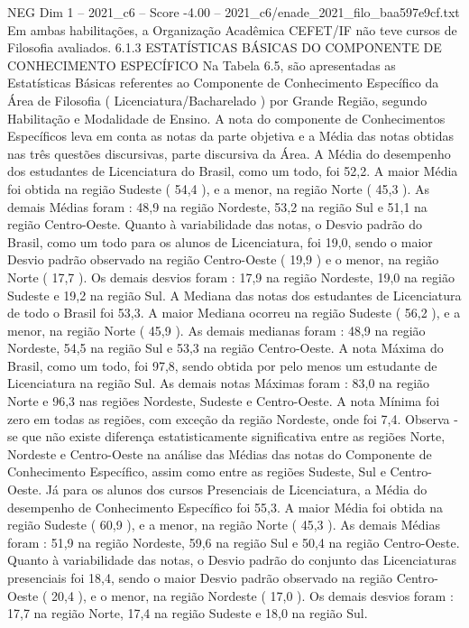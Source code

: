 \begin{textsample}{NEG Dim 1 – 2021\_c6 – Score -4.00 – 2021\_c6/enade\_2021\_filo\_baa597e9cf.txt}
Em ambas habilitações, a Organização Acadêmica CEFET/IF não teve cursos de Filosofia avaliados. 6.1.3 ESTATÍSTICAS BÁSICAS DO COMPONENTE DE CONHECIMENTO ESPECÍFICO Na Tabela 6.5, são apresentadas as Estatísticas Básicas referentes ao Componente de Conhecimento Específico da Área de Filosofia ( Licenciatura/Bacharelado ) por Grande Região, segundo Habilitação e Modalidade de Ensino.
A nota do componente de Conhecimentos Específicos leva em conta as notas da parte objetiva e a Média das notas obtidas nas três questões discursivas, parte discursiva da Área.
A Média do desempenho dos estudantes de Licenciatura do Brasil, como um todo, foi 52,2.
A maior Média foi obtida na região Sudeste ( 54,4 ), e a menor, na região Norte ( 45,3 ).
As demais Médias foram : 48,9 na região Nordeste, 53,2 na região Sul e 51,1 na região Centro-Oeste.
Quanto à variabilidade das notas, o Desvio padrão do Brasil, como um todo para os alunos de Licenciatura, foi 19,0, sendo o maior Desvio padrão observado na região Centro-Oeste ( 19,9 ) e o menor, na região Norte ( 17,7 ).
Os demais desvios foram : 17,9 na região Nordeste, 19,0 na região Sudeste e 19,2 na região Sul.
A Mediana das notas dos estudantes de Licenciatura de todo o Brasil foi 53,3.
A maior Mediana ocorreu na região Sudeste ( 56,2 ), e a menor, na região Norte ( 45,9 ).
As demais medianas foram : 48,9 na região Nordeste, 54,5 na região Sul e 53,3 na região Centro-Oeste.
A nota Máxima do Brasil, como um todo, foi 97,8, sendo obtida por pelo menos um estudante de Licenciatura na região Sul.
As demais notas Máximas foram : 83,0 na região Norte e 96,3 nas regiões Nordeste, Sudeste e Centro-Oeste.
A nota Mínima foi zero em todas as regiões, com exceção da região Nordeste, onde foi 7,4.
Observa -se que não existe diferença estatisticamente significativa entre as regiões Norte, Nordeste e Centro-Oeste na análise das Médias das notas do Componente de Conhecimento Específico, assim como entre as regiões Sudeste, Sul e Centro-Oeste.
Já para os alunos dos cursos Presenciais de Licenciatura, a Média do desempenho de Conhecimento Específico foi 55,3.
A maior Média foi obtida na região Sudeste ( 60,9 ), e a menor, na região Norte ( 45,3 ).
As demais Médias foram : 51,9 na região Nordeste, 59,6 na região Sul e 50,4 na região Centro-Oeste.
Quanto à variabilidade das notas, o Desvio padrão do conjunto das Licenciaturas presenciais foi 18,4, sendo o maior Desvio padrão observado na região Centro-Oeste ( 20,4 ), e o menor, na região Nordeste ( 17,0 ).
Os demais desvios foram : 17,7 na região Norte, 17,4 na região Sudeste e 18,0 na região Sul.

\end{textsample}
